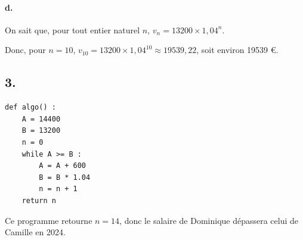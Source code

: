 \documentclass[10pt]{article}
\begin{document}
\paragraph{d.} On sait que, pour tout entier naturel \( n \), \( v_n = 13200 \times 1{,}04^n \).

Donc, pour \( n = 10 \), \( v_{10} = 13200 \times 1{,}04^{10} \approx 19539{,}22 \), soit environ 19539 €.

\subsection*{3.}

\begin{center}
\begin{lstlisting}[style=python]
def algo() :
    A = 14400
    B = 13200
    n = 0
    while A >= B :
        A = A + 600
        B = B * 1.04
        n = n + 1
    return n
\end{lstlisting}
\end{center}

Ce programme retourne \( n = 14 \), donc le salaire de Dominique dépassera celui de Camille en 2024.
\end{document}
